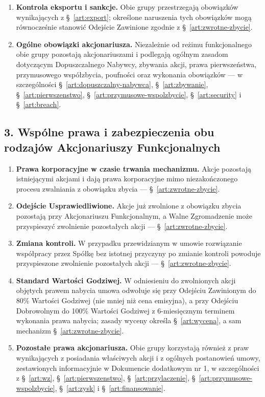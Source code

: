 \documentclass[12pt,a4paper]{report}
\begin{document}
\begin{enumerate}
  \item \textbf{Kontrola eksportu i sankcje.} Obie grupy przestrzegają obowiązków wynikających z §~\ref{art:export}; określone naruszenia tych obowiązków mogą równocześnie stanowić Odejście Zawinione zgodnie z §~\ref{art:zwrotne-zbycie}.
  \item \textbf{Ogólne obowiązki akcjonariusza.} Niezależnie od reżimu funkcjonalnego obie grupy pozostają akcjonariuszami i podlegają ogólnym zasadom dotyczącym Dopuszczalnego Nabywcy, zbywania akcji, prawa pierwszeństwa, przymusowego współzbycia, poufności oraz wykonania obowiązków --- w szczególności §~\ref{art:dopuszczalny-nabywca}, §~\ref{art:zbywanie}, §~\ref{art:pierwszenstwo}, §~\ref{art:przymusowe-wspolzbycie}, §~\ref{art:security} i §~\ref{art:breach}.
\end{enumerate}

\subsection*{3. Wspólne prawa i zabezpieczenia obu rodzajów Akcjonariuszy Funkcjonalnych}

\begin{enumerate}
  \item \textbf{Prawa korporacyjne w czasie trwania mechanizmu.} Akcje pozostają istniejącymi akcjami i dają prawa korporacyjne mimo niezakończonego procesu zwalniania z obowiązku zbycia --- §~\ref{art:zwrotne-zbycie}.
  \item \textbf{Odejście Usprawiedliwione.} Akcje już zwolnione z obowiązku zbycia pozostają przy Akcjonariuszu Funkcjonalnym, a Walne Zgromadzenie może przyspieszyć zwolnienie pozostałych akcji --- §~\ref{art:zwrotne-zbycie}.
  \item \textbf{Zmiana kontroli.} W przypadku przewidzianym w umowie rozwiązanie współpracy przez Spółkę bez istotnej przyczyny po zmianie kontroli powoduje przyspieszone zwolnienie pozostałych akcji --- §~\ref{art:zwrotne-zbycie}.
  \item \textbf{Standard Wartości Godziwej.} W odniesieniu do zwolnionych akcji objętych prawem nabycia umowa odwołuje się przy Odejściu Zawinionym do 80\% Wartości Godziwej (nie mniej niż cena emisyjna), a przy Odejściu Dobrowolnym do 100\% Wartości Godziwej z 6-miesięcznym terminem wykonania prawa nabycia; zasady wyceny określa §~\ref{art:wycena}, a sam mechanizm §~\ref{art:zwrotne-zbycie}.
  \item \textbf{Pozostałe prawa akcjonariusza.} Obie grupy korzystają również z praw wynikających z posiadania właściwych akcji i z ogólnych postanowień umowy, zestawionych informacyjnie w Dokumencie dodatkowym nr 1, w szczególności z §~\ref{art:wz}, §~\ref{art:pierwszenstwo}, §~\ref{art:przylaczenie}, §~\ref{art:przymusowe-wspolzbycie}, §~\ref{art:zysk} i §~\ref{art:finansowanie}.
\end{enumerate}
\end{document}
